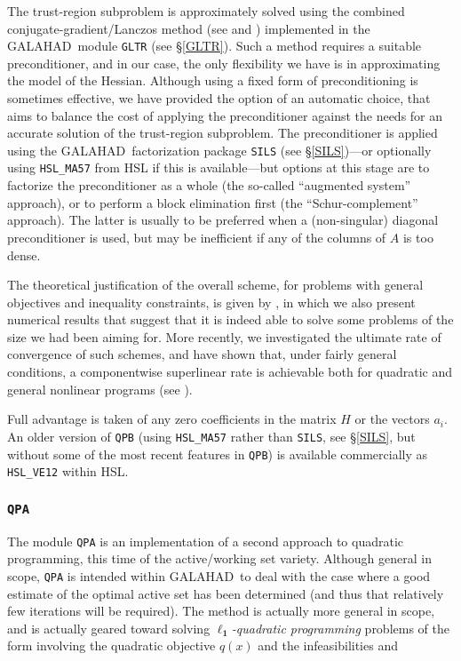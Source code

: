 \documentclass[twoside]{article}
\newcommand{\gal}{{\sf GALAHAD}}
\newcommand{\ltsubsubsection}[1]{\subsubsection{{\tt #1}} \label{#1}}
\begin{document}
The trust-region subproblem is approximately solved using the
combined conjugate-gradient/Lan\-czos method (see  and
) implemented in the \gal\ module {\tt GLTR}
(see \S\ref{GLTR}).
Such a method requires a suitable preconditioner,
and in our case, the only flexibility we have is in approximating the
model of the Hessian. Although using a fixed form of preconditioning is
sometimes effective, we have provided the option of an automatic choice,
that aims to balance the cost of applying the preconditioner against
the needs for an accurate solution of the trust-region subproblem.
The preconditioner is applied using the \gal\ factorization package
{\tt SILS} (see \S\ref{SILS})---or optionally using {\tt HSL\_MA57}
from HSL if this is available---but options at this stage are
to factorize the preconditioner as a whole (the so-called ``augmented system''
approach), or to perform a block elimination first (the ``Schur-complement''
approach). The latter is usually to be preferred when a (non-singular) diagonal
preconditioner is used, but may be inefficient if any of the columns
of $A$ is too dense.

The theoretical justification of the
overall scheme, for problems with general objectives and
inequality constraints,
is given by , in which we also present
numerical results that suggest that it is indeed able to solve
some problems of the size we had been aiming for.
More recently, we investigated the ultimate rate of convergence
of such schemes, and have shown that, under fairly general conditions,
a componentwise superlinear rate is achievable both for quadratic and general
nonlinear programs (see ).

Full advantage is taken of any zero coefficients in the matrix $H$ or the
vectors $a_{i}$.
An older version of {\tt QPB} (using {\tt HSL\_MA57} rather than {\tt SILS},
see \S\ref{SILS}, but without some of the most recent features in {\tt QPB})
is available commercially as {\tt HSL\_VE12} within HSL.

\ltsubsubsection{QPA}

The module {\tt QPA} is an implementation of a second approach
to quadratic programming, this time of the active/working set variety.
Although general in
scope, {\tt QPA} is intended within \gal\ to deal with the case
where a good
estimate of the optimal active set has been determined (and thus that
relatively few iterations will be required). The method is actually more
general in scope, and is actually geared toward solving
{\em $\mathbf{\ell_1}$-quadratic programming} problems of the form
involving the quadratic objective $q(x)$ and the infeasibilities
and
\end{document}
